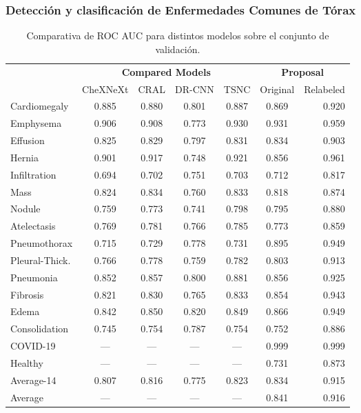 \documentclass{beamer}
\begin{document}

\begin{frame}
\frametitle{Detección y clasificación de Enfermedades Comunes de Tórax}

\tiny

\begin{table}[h!]
\centering
\begin{tabular}{|l||c|c|c|c|c|r|}
    \hline
    \multicolumn{1}{|c||}{}	&	\multicolumn{4}{c|}{\bf Compared Models}    &	\multicolumn{2}{c|}{\bf Proposal} 	\\
    \cline{2-7}
                        &	CheXNeXt	&	CRAL	&	DR-CNN	&	TSNC    & Original	& Relabeled \\
\hline\hline
    Cardiomegaly        	&	0.885	&	0.880	&	0.801	&	0.887	& 0.869    &	0.920	\\
    Emphysema           	&	0.906	&	0.908	&	0.773	&	0.930	& 0.931	   &	0.959	\\
    Effusion            	&	0.825	&	0.829	&	0.797	&	0.831	& 0.834	   &	0.903	\\
    Hernia              	&	0.901	&	0.917	&	0.748	&   0.921   & 0.856	   &    0.961	\\
    Infiltration        	&	0.694	&	0.702	&	0.751	&	0.703	& 0.712	   &	0.817	\\
    Mass                	&	0.824	&	0.834	&	0.760	&	0.833	& 0.818	   &	0.874	\\
    Nodule              	&	0.759	&	0.773	&	0.741	&	0.798	& 0.795	   &	0.880	\\
    Atelectasis         	&	0.769	&	0.781	&	0.766	&	0.785	& 0.773	   &	0.859	\\
    Pneumothorax        	&	0.715	&	0.729	&	0.778	&	0.731	& 0.895	   &	0.949	\\
    Pleural-Thick.      	&	0.766	&	0.778	&	0.759	&	0.782	& 0.803	   &	0.913	\\
    Pneumonia           	&	0.852	&	0.857	&	0.800	&	0.881	& 0.856	   &	0.925	\\
    Fibrosis            	&	0.821	&	0.830	&	0.765	&	0.833	& 0.854	   &	0.943	\\
    Edema               	&	0.842	&	0.850	&	0.820	&	0.849	& 0.866	   &	0.949	\\
    Consolidation       	&	0.745	&	0.754	&	0.787	&	0.754	& 0.752	   &	0.886	\\
\hline
    COVID-19            	&	---	    &	--- 	&	---	    &	--- 	& 0.999    &	0.999	\\
    Healthy              	&	--- 	&	---	    &	--- 	&	---	    & 0.731    &	0.873	\\
\hline\hline
Average-14	            &	0.807	&	0.816	&	0.775	&	0.823	& 0.834	&	0.915	\\
Average	                &	---	    &	---	    &	---	    & 	---     & 0.841	&	0.916	\\
\hline
\end{tabular}
\caption{Comparativa de ROC AUC para distintos modelos sobre el conjunto de validación.}
\label{table_roc_auc_relabled}
\end{table}

\end{frame}
\end{document}

